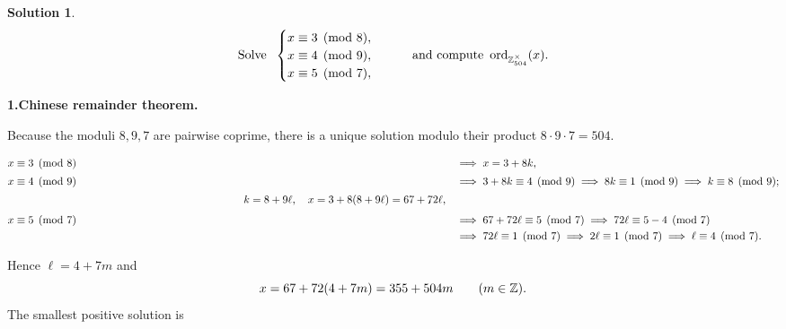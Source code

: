\documentclass[12pt]{article}
\theoremstyle{definition} %
\newtheorem{solution}{Solution}
\theoremstyle{plain} %
\begin{document}
                  \begin{solution}
                    \[
                       \text{Solve }\;
                       \begin{cases}
                          x\equiv 3 \pmod 8,\\
                          x\equiv 4 \pmod 9,\\
                          x\equiv 5 \pmod 7,
                       \end{cases}
                       \qquad
                       \text{and compute }\operatorname{ord}_{\Bbb Z_{504}^{\times}}(x).
                    \]
                    
                    \bigskip
                    \textbf{1.\;Chinese remainder theorem.}
                    
                    Because the moduli \(8,9,7\) are pairwise coprime,
                    there is a unique solution modulo their product \(8\cdot9\cdot7=504\).
                    
                    \[
                    \begin{aligned}
                    x &\equiv 3 \pmod 8
                         &&\Longrightarrow\;x=3+8k,\\[2pt]
                    x &\equiv 4 \pmod 9
                         &&\Longrightarrow\;3+8k\equiv4\pmod 9
                                          \;\Longrightarrow\;8k\equiv1\pmod 9
                                          \;\Longrightarrow\;k\equiv8\pmod 9;\\[2pt]
                    &\hspace{7.5cm}
                    k=8+9\ell, \quad x=3+8(8+9\ell)=67+72\ell,\\[4pt]
                    x &\equiv 5 \pmod 7
                         &&\Longrightarrow\;67+72\ell\equiv5\pmod 7
                                          \;\Longrightarrow\;72\ell\equiv5-4\pmod 7\\
                    &&&\Longrightarrow\;72\ell\equiv1\pmod 7
                                          \;\Longrightarrow\;2\ell\equiv1\pmod 7
                                          \;\Longrightarrow\;\ell\equiv4\pmod 7.
                    \end{aligned}
                    \]
                    
                    Hence \(\ell=4+7m\) and
                    \[
                       x = 67+72(4+7m)=355+504m\qquad(m\in\Bbb Z).
                    \]
                    The smallest positive solution is  
                    

\end{solution}
\end{document}
